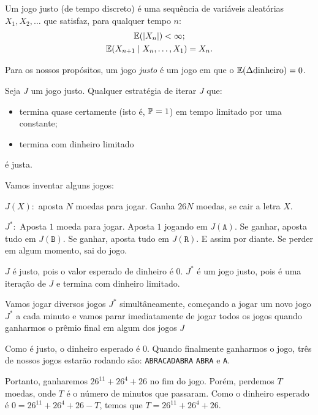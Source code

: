 \documentclass[10pt,a4paper]{article}
\begin{document}
	\begin{defn}
		Um jogo justo (de tempo discreto) é uma sequência de variáveis aleatórias $X_1, X_2, \dots$ que satisfaz, para qualquer tempo $n$:
		\begin{gather*}
			\mathbb{E}(|X_n|) < \infty;\\
			\mathbb{E}(X_{n+1} \mid X_n, \dots, X_1) = X_n.
		\end{gather*}
	\end{defn}

	\begin{cor}
	Para os nossos propósitos, um jogo \emph{justo} é um jogo em que o $\mathbb{E}(\Delta\text{dinheiro}) = 0$.
	\end{cor}

	\begin{thm}
		Seja $J$ um jogo justo. Qualquer estratégia de iterar $J$ que:
		\begin{itemize}
			\item termina quase certamente (isto é, $\mathbb{P} = 1$) em tempo limitado por uma constante;
			\item termina com dinheiro limitado
		\end{itemize}
		é justa.
	\end{thm}


	\begin{sol}
		Vamos inventar alguns jogos:

		$J(X):$ aposta $N$ moedas para jogar. Ganha $26N$ moedas, se cair a letra $X$.

		$J^*:$ Aposta $1$ moeda para jogar. Aposta $1$ jogando em $J(\mathtt{A})$. Se ganhar, aposta tudo em $J(\mathtt{B})$. Se ganhar, aposta tudo em $J(\mathtt{R})$. E assim por diante. Se perder em algum momento, sai do jogo.

		$J$ é justo, pois o valor esperado de dinheiro é 0. $J^*$ é um jogo justo, pois é uma iteração de $J$ e termina com dinheiro limitado.

		Vamos jogar diversos jogos $J^*$ simultâneamente, começando a jogar um novo jogo $J^*$ a cada minuto e vamos parar imediatamente de jogar todos os jogos quando ganharmos o prêmio final em algum dos jogos $J$

		Como é justo, o dinheiro esperado é $0$. Quando finalmente ganharmos o jogo, três de nossos jogos estarão rodando são: \texttt{ABRACADABRA} \texttt{ABRA} e \texttt{A}.

		Portanto, ganharemos $26^{11} + 26^4 + 26$ no fim do jogo. Porém, perdemos $T$ moedas, onde $T$ é o número de minutos que passaram. Como o dinheiro esperado é $0 = 26^{11} + 26^4 + 26 - T$, temos que $T = 26^{11} + 26^4 + 26$.
	\end{sol}
\end{document}
